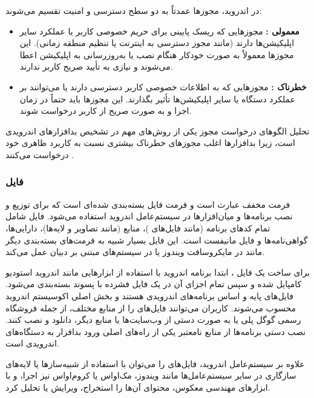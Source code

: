 در اندروید، مجوزها عمدتاً به دو سطح دسترسی و امنیت تقسیم می‌شوند:
\begin{itemize}
    \renewcommand{\labelitemi}{\lr{$\bullet$}}
    \item \textbf{معمولی :} مجوزهایی که ریسک پایینی برای حریم خصوصی کاربر یا عملکرد سایر اپلیکیشن‌ها دارند (مانند مجوز دسترسی به اینترنت یا تنظیم منطقه زمانی). این مجوزها معمولاً به صورت خودکار هنگام نصب یا به‌روزرسانی به اپلیکیشن اعطا می‌شوند و نیازی به تأیید صریح کاربر ندارند.
    \item \textbf{خطرناک :} مجوزهایی که به اطلاعات خصوصی کاربر دسترسی دارند یا می‌توانند بر عملکرد دستگاه یا سایر اپلیکیشن‌ها تأثیر بگذارند. این مجوزها باید حتماً در زمان اجرا و به صورت صریح از کاربر درخواست شوند.
\end{itemize}
تحلیل الگوهای درخواست مجوز یکی از روش‌های مهم در تشخیص بدافزارهای اندرویدی است، زیرا بدافزارها اغلب مجوزهای خطرناک بیشتری نسبت به کاربرد ظاهری خود درخواست می‌کنند \cite{Drebin}.

\subsubsection{فایل }
فرمت  مخفف عبارت  است و فرمت فایل بسته‌بندی شده‌ای است که برای توزیع و نصب برنامه‌ها و میان‌افزارها در سیستم‌عامل اندروید استفاده می‌شود. فایل  شامل تمام کدهای برنامه (مانند فایل‌های )، منابع (مانند تصاویر و لایه‌ها)، دارایی‌ها، گواهی‌نامه‌ها و فایل مانیفست  است. این فایل بسیار شبیه به فرمت‌های بسته‌بندی دیگر مانند  در مایکروسافت ویندوز یا  در سیستم‌های مبتنی بر دبیان عمل می‌کند.

برای ساخت یک فایل ، ابتدا برنامه اندروید با استفاده از ابزارهایی مانند اندروید استودیو کامپایل شده و سپس تمام اجزای آن در یک فایل فشرده با پسوند  بسته‌بندی می‌شود. فایل‌های  پایه و اساس برنامه‌های اندرویدی هستند و بخش اصلی اکوسیستم اندروید محسوب می‌شوند. کاربران می‌توانند فایل‌های  را از منابع مختلف، از جمله فروشگاه رسمی گوگل پلی  یا به صورت دستی  از وب‌سایت‌ها یا منابع دیگر، دانلود و نصب کنند. نصب دستی برنامه‌ها از منابع نامعتبر یکی از راه‌های اصلی ورود بدافزار به دستگاه‌های اندرویدی است.

علاوه بر سیستم‌عامل اندروید، فایل‌های  را می‌توان با استفاده از شبیه‌سازها یا لایه‌های سازگاری در سایر سیستم‌عامل‌ها مانند ویندوز، مک‌اواس یا کروم‌اواس نیز اجرا، و با ابزارهای مهندسی معکوس، محتوای آن‌ها را استخراج، ویرایش یا تحلیل کرد.

